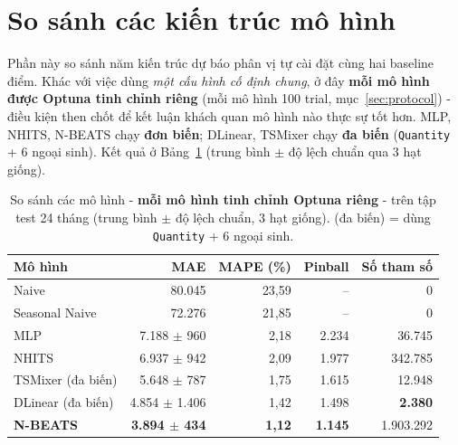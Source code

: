 \documentclass[12pt, a4paper]{report}
\begin{document}
\section{So sánh các kiến trúc mô hình}
\label{sec:comparison}

Phần này so sánh năm kiến trúc dự báo phân vị tự cài đặt cùng hai baseline điểm. Khác với việc dùng \textit{một cấu hình cố định chung}, ở đây \textbf{mỗi mô hình được Optuna tinh chỉnh riêng} (mỗi mô hình 100 trial, mục~\ref{sec:protocol}) - điều kiện then chốt để kết luận khách quan mô hình nào thực sự tốt hơn. MLP, NHITS, N-BEATS chạy \textbf{đơn biến}; DLinear, TSMixer chạy \textbf{đa biến} (\texttt{Quantity} + 6 ngoại sinh). Kết quả ở Bảng~\ref{tab:model_compare} (trung bình $\pm$ độ lệch chuẩn qua 3 hạt giống).

\begin{table}[H]
\centering
\caption{So sánh các mô hình - \textbf{mỗi mô hình tinh chỉnh Optuna riêng} - trên tập test 24 tháng (trung bình $\pm$ độ lệch chuẩn, 3 hạt giống). (đa biến) = dùng \texttt{Quantity} + 6 ngoại sinh.}
\label{tab:model_compare}
\small
\begin{tabular}{|l|r|r|r|r|}
\hline
\rowcolor{gray!18}
Mô hình & MAE & MAPE (\%) & Pinball & Số tham số \\
\hline
Naive          & 80.045 & 23,59 & -- & 0 \\
Seasonal Naive & 72.276 & 21,85 & -- & 0 \\
\hline
MLP     & 7.188 $\pm$ 960 & 2,18 & 2.234 & 36.745 \\
NHITS   & 6.937 $\pm$ 942 & 2,09 & 1.977 & 342.785 \\
TSMixer (đa biến) & 5.648 $\pm$ 787 & 1,75 & 1.615 & 12.948 \\
DLinear (đa biến) & 4.854 $\pm$ 1.406 & 1,42 & 1.498 & \textbf{2.380} \\
\rowcolor{gray!18}
\textbf{N-BEATS} & \textbf{3.894 $\pm$ 434} & \textbf{1,12} & \textbf{1.145} & 1.903.292 \\
\hline
\end{tabular}
\end{table}
\end{document}
